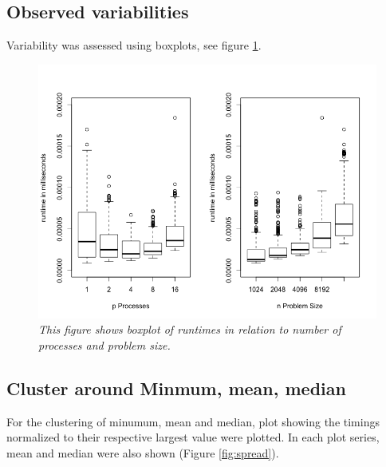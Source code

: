 \documentclass[a4paper,11pt,twoside]{article}
\begin{document}
\subsection{Observed variabilities}
Variability was assessed using boxplots, see figure \ref{fig:boxplot}.
\begin{figure}
  \centering
    \includegraphics[width=1\textwidth]{boxplot.png}
    \caption{\textit{This figure shows boxplot of runtimes in relation to number of processes and problem size.}}
    \label{fig:boxplot}
\end{figure}



\subsection{Cluster around Minmum, mean, median}

For the clustering of minumum, mean and median, plot showing the timings normalized to their respective largest value were plotted. In each plot series, mean and median were also shown (Figure \ref{fig:spread}).
\end{document}
